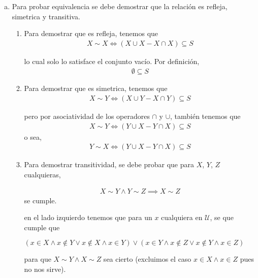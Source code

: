 \begin{enumerate}[a)]
    
    
    \item Para probar equivalencia se debe demostrar que la relación es refleja, simetrica y transitiva.
    
    \begin{enumerate}[1)]
        \item Para demostrar que es refleja, tenemos que 
        \begin{align*}
            X \sim X \iff (X \cup X - X \cap X) \subseteq S
        \end{align*}
        
        lo cual solo lo satisface el conjunto vacío. Por definición,
        \begin{align*}
            \emptyset \subseteq S
        \end{align*}
        
        \item Para demostrar que es simetrica, tenemos que 
        \begin{align*}
            X \sim Y \iff (X \cup Y - X \cap Y) \subseteq S
        \end{align*}
        
        pero por asociatividad de los operadores $\cap$ y $\cup$, también tenemos que
        \begin{align*}
            X \sim Y \iff (Y \cup X - Y \cap X) \subseteq S
        \end{align*}
        o sea,
        \begin{align*}
            Y \sim X \iff (Y \cup X - Y \cap X) \subseteq S
        \end{align*}
    
        \item Para demostrar transitividad, se debe probar que para $X$, $Y$, $Z$ cualquieras,
        
        \begin{align*}
            X \sim Y \land Y \sim Z \implies X \sim Z
        \end{align*}
        se cumple.
        
        en el lado izquierdo tenemos que para un $x$ cualquiera en  $\mathcal{U}$, se que cumple que
        
        $(x \in X \land x \notin Y \lor x \notin X \land x \in Y) \lor (x \in Y \land x \notin Z \lor x \notin Y \land x \in Z)$
        
        para que $X \sim Y \land X \sim Z$ sea cierto (excluimos el caso $x \in X \land x \in Z$ pues no nos sirve).
        

\end{enumerate}
\end{enumerate}

